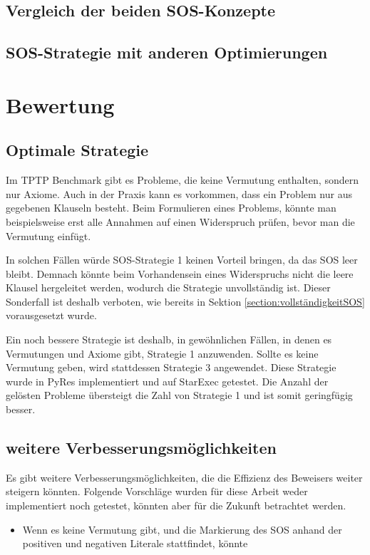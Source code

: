 	
	\subsection{Vergleich der beiden SOS-Konzepte}
	\subsection{SOS-Strategie mit anderen Optimierungen}
		
\section{Bewertung}
	\subsection{Optimale Strategie}
	Im TPTP Benchmark gibt es Probleme, die keine Vermutung enthalten, sondern nur Axiome. Auch in der Praxis kann es vorkommen, dass ein Problem nur aus gegebenen Klauseln besteht. Beim Formulieren eines Problems, könnte man beispielsweise erst alle Annahmen auf einen Widerspruch prüfen, bevor man die Vermutung einfügt.
	
	In solchen Fällen würde SOS-Strategie 1 keinen Vorteil bringen, da das SOS leer bleibt. Demnach könnte beim Vorhandensein eines Widerspruchs nicht die leere Klausel hergeleitet werden, wodurch die Strategie unvollständig ist. Dieser Sonderfall ist deshalb verboten, wie bereits in Sektion \ref{section:vollständigkeitSOS} vorausgesetzt wurde.
	
	Ein noch bessere Strategie ist deshalb, in gewöhnlichen Fällen, in denen es Vermutungen und Axiome gibt, Strategie 1 anzuwenden. Sollte es keine Vermutung geben, wird stattdessen Strategie 3 angewendet. Diese Strategie wurde in PyRes implementiert und auf StarExec getestet. Die Anzahl der gelösten Probleme übersteigt die Zahl von Strategie 1 und ist somit geringfügig besser.
	
	\subsection{weitere Verbesserungsmöglichkeiten}
	Es gibt weitere Verbesserungsmöglichkeiten, die die Effizienz des Beweisers weiter steigern könnten. Folgende Vorschläge wurden für diese Arbeit weder implementiert noch getestet, könnten aber für die Zukunft betrachtet werden.
	\begin{itemize}
		\item Wenn es keine Vermutung gibt, und die Markierung des SOS anhand der positiven und negativen Literale stattfindet, könnte 
	\end{itemize}

